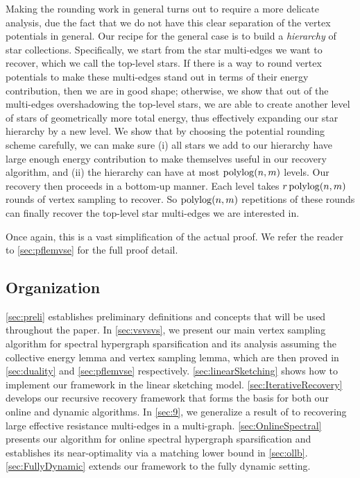 \documentclass{article}
\begin{document}
Making the rounding work in general turns out to require a more delicate analysis,
due the fact that we do not have this clear separation of the vertex potentials
in general. Our recipe for the general case is to build a
\textit{hierarchy} of star collections.
Specifically, we start from the star multi-edges we want to recover,
which we call the top-level stars.
If there is a way to round vertex potentials to make these multi-edges
stand out in terms of their energy contribution, then we are in good shape;
otherwise, we show that out of the multi-edges overshadowing the top-level
stars, we are able to create another level of stars of geometrically more
total energy, thus effectively expanding our star hierarchy by a new level.
We show that by choosing the potential rounding scheme carefully,
we can make sure (i) all stars we add to our hierarchy have large enough
energy contribution to make themselves useful in our recovery algorithm,
and (ii) the hierarchy can have at most $\operatorname{polylog}(n,m)$ levels.
Our recovery then proceeds in a bottom-up manner. Each level takes
$r\operatorname{polylog}(n,m)$ rounds of vertex sampling to recover.
So $\operatorname{polylog}(n,m)$ repetitions of these rounds can finally
recover the top-level star multi-edges we are interested in.

Once again, this is a vast simplification of the actual proof. We refer the reader to \cref{sec:pflemvse}
for the full proof detail.


\subsection{Organization}

\cref{sec:preli} establishes preliminary definitions and concepts that will be used throughout the paper. In \cref{sec:vsvsvs}, we present our main vertex sampling algorithm for spectral hypergraph sparsification and its analysis assuming the collective energy lemma and vertex sampling lemma,
which are then proved in \cref{sec:duality} and \cref{sec:pflemvse} respectively.
\cref{sec:linearSketching} shows how to implement our framework in the linear sketching model. \cref{sec:IterativeRecovery} develops our recursive recovery framework that forms the basis for both our online and dynamic algorithms.
In \cref{sec:9},
we generalize a result of \cite{ADKKP16} to recovering large effective resistance multi-edges in a multi-graph.
\cref{sec:OnlineSpectral} presents our algorithm for online spectral hypergraph sparsification and establishes its near-optimality via a matching lower bound in \cref{sec:ollb}. \cref{sec:FullyDynamic} extends our framework to the fully dynamic setting.
\end{document}
